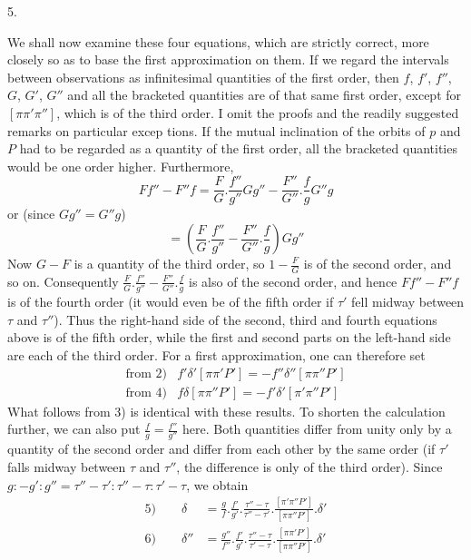 \begin{center}5.\end{center}
We shall now examine these four equations, which are strictly correct, more closely so as to base the first approximation on them. If we regard the intervals between observations as infinitesimal quantities of the first order, then $f$, $f'$, $f''$, $G$, $G'$, $G''$ and all the bracketed quantities are of that same first order, except for $[\pi\pi'\pi'']$, which is of the third order. I omit the proofs and the readily suggested remarks on particular excep%
%
tions. If the mutual inclination of the orbits of $p$ and $P$ had to be regarded as a quantity of the first order, all the bracketed quantities would be one order higher. Furthermore,
\[
Ff''-F''f=\frac FG.\frac{f''}{g''}Gg''-\frac{F''}{G''}.\frac fg G''g
\]
or (since $Gg''=G''g$)
\[
=\left(\frac FG.\frac{f''}{g''}-\frac{F''}{G''}.\frac fg\right)Gg''
\]
Now $G-F$ is a quantity of the third order, so $1-\frac FG$ is of the second order, and so on. Consequently $\frac FG.\frac{f''}{g''}-\frac{F''}{G''}.\frac fg$ is also of the second order, and hence $Ff''-F''f$ is of the fourth order (it would even be of the fifth order if $\tau'$ fell midway between $\tau$ and $\tau''$). Thus the right-hand side of the second, third and fourth equations above is of the fifth order, while the first and second parts on the left-hand side are each of the third order. For a first approximation, one can therefore set
\[
\begin{array}{ll}
\text{from 2)}&f'\delta'[\pi\pi'P']=-f''\delta''[\pi\pi''P']\\
\text{from 4)}&f\delta[\pi\pi''P']=-f'\delta'[\pi'\pi''P']
\end{array}
\]
What follows from 3) is identical with these results. To shorten the calculation further, we can also put $\frac fg=\frac{f''}{g''}$ here. Both quantities differ from unity only by a quantity of the second order and differ from each other by the same order (if $\tau'$ falls midway between $\tau$ and $\tau''$, the difference is only of the third order). Since $g:-g':g''=\tau''-\tau':\tau''-\tau:\tau'-\tau$, we obtain
\[
\begin{aligned}
5)\qquad\delta&=\frac gf.\frac{f'}{g'}.\frac{\tau''-\tau}{\tau''-\tau'}.\frac{[\pi'\pi''P']}{[\pi\pi''P']}.\delta'\\
6)\qquad\delta''&=\frac{g''}{f''}.\frac{f'}{g'}.\frac{\tau''-\tau}{\tau'-\tau}.\frac{[\pi\pi'P']}{[\pi\pi''P']}.\delta'
\end{aligned}
\]

